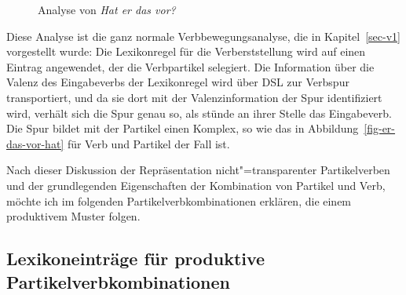 \begin{figure}[htb]
\caption{\label{fig-hat-er-das-vor}Analyse von {\em Hat er das vor?\/}}
\end{figure}
Diese Analyse ist die ganz normale Verbbewegungsanalyse, die in Kapitel~\ref{sec-v1}
vorgestellt wurde: Die Lexikonregel für die Verberststellung wird auf einen Eintrag angewendet,
der die Verbpartikel selegiert. Die Information über die Valenz des Eingabeverbs der
Lexikonregel wird über DSL zur Verbspur transportiert, und da sie dort mit der
Valenzinformation der Spur identifiziert wird, verhält sich die Spur genau so,
als stünde an ihrer Stelle das Eingabeverb. Die Spur bildet mit der Partikel einen
Komplex, so wie das in Abbildung~\ref{fig-er-das-vor-hat} für Verb und Partikel der
Fall ist.

Nach dieser Diskussion der Repräsentation nicht"=transparenter Partikelverben und 
der grundlegenden Eigenschaften der Kombination von Partikel und Verb, möchte ich
im folgenden Partikelverbkombinationen erklären, die einem produktivem Muster folgen.



\subsection{Lexikoneinträge für produktive Partikelverbkombinationen}
\label{sec-lr-for-transp-pvs}


